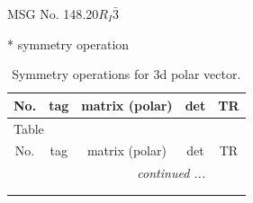 \documentclass[fleqn,8pt]{jsarticle}
\begin{document}
\setcounter{MaxMatrixCols}{32}

\renewcommand{\tablename}{Table~}
\renewcommand{\figurename}{Figure~}
\begin{center}
\LARGE
MSG No. 148.20\quad$R_{I}\bar{3}$
\end{center}
* symmetry operation
\renewcommand{\arraystretch}{1.3}
\begin{longtable}{ccccc}
\caption{Symmetry operations for 3d polar vector.}
 \\
 \hline \hline
No. & tag & matrix (polar) & det & TR \\ \hline \endfirsthead

\multicolumn{4}{l}{\tablename\ \thetable{}} \\
 \hline \hline
No. & tag & matrix (polar) & det & TR \\ \hline \endhead

 \hline \hline
\multicolumn{4}{r}{\footnotesize\it continued ...} \\ \endfoot

 \hline \hline
\multicolumn{4}{r}{} \\ \endlastfoot


\end{longtable}
\end{document}
